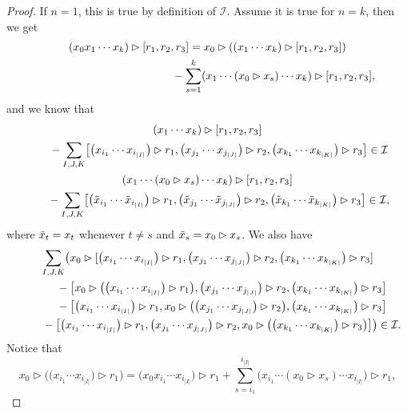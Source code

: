\documentclass[10pt,a4paper]{amsart}
\numberwithin{equation}{section}
\begin{document}
\begin{proof}
If $n=1$, this is true by definition of $\mathcal{I}$. Assume it is true for $n=k$, then we get
\begin{gather*}
 (x_0 x_1 \cdots x_k) \rhd [r_1, r_2, r_3] = x_0 \rhd ( (x_1 \cdots x_k) \rhd [r_1, r_2 , r_3] ) \\ \hphantom{(x_0 x_1 \cdots x_k) \rhd [r_1, r_2, r_3] =}{}
 - \sum_{s=1}^k (x_1 \cdots (x_0 \rhd x_s) \cdots x_k) \rhd [r_1, r_2, r_3],
\end{gather*}
and we know that
\begin{gather*}
 (x_1 \cdots x_k) \rhd [r_1, r_2, r_3] \\
\qquad {}- \sum_{I,J,K} \bigl[\bigl(x_{i_1} \cdots x_{i_{|I|}}\bigr) \rhd r_1, \bigl(x_{j_1} \cdots x_{j_{|J|}}\bigr) \rhd r_2, \bigl(x_{k_1} \cdots x_{k_{|K|}}\bigr) \rhd r_3\bigr] \in \mathcal{I} \\
 (x_1 \cdots (x_0 \rhd x_s) \cdots x_k) \rhd [r_1, r_2, r_3] \\
\qquad {}- \sum_{I,J,K} \bigl[\bigl(\Tilde{x}_{i_1} \cdots \Tilde{x}_{i_{|I|}}\bigr) \rhd r_1, \bigl(\Tilde{x}_{j_1} \cdots \Tilde{x}_{j_{|J|}}\bigr) \rhd r_2, \bigl(\Tilde{x}_{k_1} \cdots \Tilde{x}_{k_{|K|}}\bigr) \rhd r_3\bigr] \in \mathcal{I},
\end{gather*}
where $\Tilde{x}_t=x_t$ whenever $t\neq s$ and $\Tilde{x}_s=x_0 \rhd x_s$. We also have
\begin{gather*}
 \sum_{I,J,K} \bigl( x_0 \rhd [\bigl(x_{i_1} \cdots x_{i_{|I|}}\bigr) \rhd r_1, \bigl(x_{j_1} \cdots x_{j_{|J|}}\bigr) \rhd r_2, \bigl(x_{k_1} \cdots x_{k_{|K|}}\bigr) \rhd r_3] \\ \hphantom{\sum_{I,J,K}\bigl(}{}
 - \bigl[x_0 \rhd \bigl( \bigl(x_{i_1} \cdots x_{i_{|I|}}\bigr) \rhd r_1 \bigr), \bigl(x_{j_1} \cdots x_{j_{|J|}}\bigr) \rhd r_2, \bigl(x_{k_1} \cdots x_{k_{|K|}}\bigr) \rhd r_3\bigr] \\ \hphantom{\sum_{I,J,K}\bigl(}{}
 - \bigl[\bigl(x_{i_1} \cdots x_{i_{|I|}}\bigr) \rhd r_1, x_0 \rhd \bigl( \bigl(x_{j_1} \cdots x_{j_{|J|}}\bigr) \rhd r_2\bigr) , \bigl(x_{k_1} \cdots x_{k_{|K|}}\bigr) \rhd r_3\bigr] \\ \hphantom{\sum_{I,J,K}\bigl(}{}
 - \bigl[\bigl(x_{i_1} \cdots x_{i_{|I|}}\bigr) \rhd r_1, \bigl(x_{j_1} \cdots x_{j_{|J|}}\bigr) \rhd r_2, x_0 \rhd \bigl( \bigl(x_{k_1} \cdots x_{k_{|K|}}\bigr) \rhd r_3 \bigr) \bigr] \bigr) \in \mathcal{I}.
\end{gather*}
Notice that
\[
x_0 \rhd \bigl( \bigl(x_{i_1} \cdots x_{i_{|I|}}\bigr) \rhd r_1 \bigr) = \bigl(x_0x_{i_1} \cdots x_{i_{|I|}}\bigr) \rhd r_1 + \sum_{s=i_1}^{i_{|I|}} \bigl(x_{i_1} \cdots (x_0 \rhd x_s) \cdots x_{i_{|I|}}\bigr) \rhd r_1,
\]
\end{proof}
\end{document}
